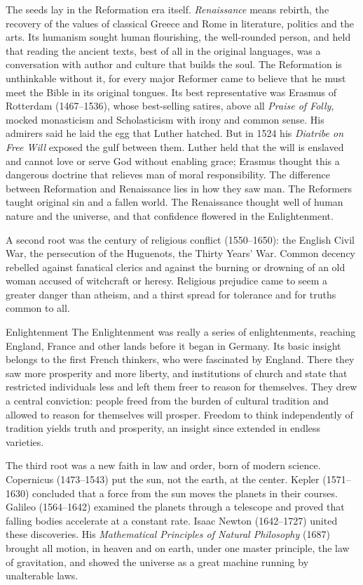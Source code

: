 The seeds lay in the Reformation era itself. \emph{Renaissance} means rebirth, the recovery of the
values of classical Greece and Rome in literature, politics and the arts. Its humanism sought human
flourishing, the well-rounded person, and held that reading the ancient texts, best of all in the
original languages, was a conversation with author and culture that builds the soul. The Reformation
is unthinkable without it, for every major Reformer came to believe that he must meet the Bible in
its original tongues. Its best representative was Erasmus of Rotterdam (1467--1536), whose
best-selling satires, above all \emph{Praise of Folly}, mocked monasticism and Scholasticism with
irony and common sense. His admirers said he laid the egg that Luther hatched. But in 1524 his
\emph{Diatribe on Free Will} exposed the gulf between them. Luther held that the will is enslaved and
cannot love or serve God without enabling grace; Erasmus thought this a dangerous doctrine that
relieves man of moral responsibility. The difference between Reformation and Renaissance lies in how they saw man. The Reformers taught original sin and a fallen world. The Renaissance thought
well of human nature and the universe, and that confidence flowered in the Enlightenment.

A second root was the century of religious conflict (1550--1650): the English Civil War, the
persecution of the Huguenots, the Thirty Years' War. Common decency rebelled against fanatical
clerics and against the burning or drowning of an old woman accused of witchcraft or heresy.
Religious prejudice came to seem a greater danger than atheism, and a thirst spread for tolerance and
for truths common to all.

\begin{sidebox}{Enlightenment}
The Enlightenment was really a series of enlightenments, reaching England, France and other lands
before it began in Germany. Its basic insight belongs to the first French thinkers, who were
fascinated by England. There they saw more prosperity and more liberty, and institutions of church
and state that restricted individuals less and left them freer to reason for themselves. They drew a
central conviction: people freed from the burden of cultural tradition and allowed to reason for
themselves will prosper. Freedom to think independently of tradition yields truth and prosperity, an
insight since extended in endless varieties.
\end{sidebox}

The third root was a new faith in law and order, born of modern science. Copernicus (1473--1543) put
the sun, not the earth, at the center. Kepler (1571--1630) concluded that a force from the sun moves
the planets in their courses. Galileo (1564--1642) examined the planets through a telescope and
proved that falling bodies accelerate at a constant rate. Isaac Newton (1642--1727) united these
discoveries. His \emph{Mathematical Principles of Natural Philosophy} (1687) brought all motion, in
heaven and on earth, under one master principle, the law of gravitation, and showed the universe as a
great machine running by unalterable laws.

